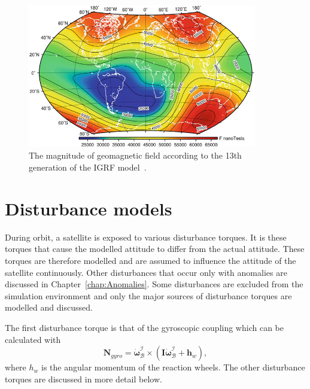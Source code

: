 \begin{figure}[!htb]
	\centering
	\includegraphics[width = 10cm]{Figures/IGRF-13th.png}
	\caption{The magnitude of geomagnetic field according to the 13th generation of the IGRF model~\cite{koskinen2022radiation}.}
	\label{fig:IGRF13th}
\end{figure}

\section{Disturbance models}
\label{section: disturbance models}
During orbit, a satellite is exposed to various disturbance torques. It is these torques that cause the modelled attitude to differ from the actual attitude. These torques are therefore modelled and are assumed to influence the attitude of the satellite continuously. Other disturbances that occur only with anomalies are discussed in Chapter~\ref{chap:Anomalies}. Some disturbances are excluded from the simulation environment and only the major sources of disturbance torques are modelled and discussed.

The first disturbance torque is that of the gyroscopic coupling which can be calculated with
\begin{equation}
\mathbf{N}_{gyro} = \boldsymbol{\dot{\omega}}_\mathcal{B}^\mathcal{I} \times (\mathbf{I}\boldsymbol{\dot{\omega}}_\mathcal{B}^\mathcal{I} + \mathbf{h}_w),
\end{equation}
where $h_w$ is the angular momentum of the reaction wheels. The other disturbance torques are discussed in more detail below.

